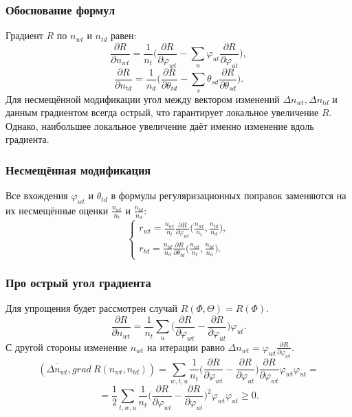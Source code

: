 \documentclass[utf8]{beamer}
\renewcommand{\geq}{\geqslant}
\renewcommand{\phi}{\varphi}
\begin{document}
	
\begin{frame}
\frametitle{Обоснование формул}
Градиент $R$ по $n_{wt}$ и $n_{td}$ равен:
\[
\frac{\partial{R}}{\partial{n_{wt}}} = \frac{1}{n_t} \bigg(\frac{\partial{R}}{\partial{\phi_{wt}}} - \sum\limits_u \phi_{ut} \frac{\partial{R}}{\partial{\phi_{ut}}}\bigg),
\]
\[
\frac{\partial{R}}{\partial{n_{td}}} = \frac{1}{n_d} \bigg( \frac{\partial{R}}{\partial{\theta_{td}}} - \sum\limits_s \theta_{sd} \frac{\partial{R}}{\partial{\theta_{sd}}} \bigg).
\]
Для несмещённой модификации угол между вектором изменений $\Delta n_{wt}, \Delta n_{td}$ и данным градиентом всегда острый, что гарантирует локальное увеличение $R$. Однако, наибольшее локальное увеличение даёт именно изменение вдоль градиента.
\end{frame}


\begin{frame}
\frametitle{Несмещённая модификация}
Все вхождения $\phi_{wt}$ и $\theta_{td}$ в формулы регуляризационных поправок заменяются на их несмещённые оценки $\frac{n_{wt}}{n_t}$ и $\frac{n_{td}}{n_d}$:
\[
\left\{
	\begin{aligned}
		r_{wt} =  \frac{n_{wt}}{n_t} \frac{\partial{R}}{\partial{\phi_{wt}}} \bigg(\frac{n_{wt}}{n_t}, \frac{n_{td}}{n_d}\bigg),\\
		r_{td} = \frac{n_{td}}{n_d} \frac{\partial{R}}{\partial{\theta_{td}}} \bigg(\frac{n_{wt}}{n_t}, \frac{n_{td}}{n_d}\bigg).
	\end{aligned}
\right.
\]
\end{frame}

\begin{frame}
\frametitle{Про острый угол градиента}

Для упрощения будет рассмотрен случай $R(\Phi, \Theta) = R(\Phi)$.
\[
\frac{\partial{R}}{\partial{n_{wt}}}  = \frac{1}{n_t} \sum_{u} \bigg(\frac{\partial{R}}{\partial{\phi_{wt}}}  -  \frac{\partial{R}}{\partial{\phi_{ut}}} \bigg)  \phi_{ut}.
\]
С другой стороны изменение $n_{wt}$ на итерации равно $ \Delta n_{wt} =  \phi_{wt} \frac{\partial{R}}{\partial{\phi_{wt}}}$.
\[
(\overline{\Delta n_{wt}}, grad\ R(n_{wt}, n_{td})) = \sum\limits_{w, t, u}  \frac{1}{n_{t}}  \bigg(  \frac{\partial{R}}{\partial{\phi_{wt}}}  -  \frac{\partial{R}}{\partial{\phi_{ut}}}  \bigg)  \frac{\partial{R}}{\partial{\phi_{wt}}} \phi_{wt} \phi_{ut}  = 
\]
\[
= \frac12  \sum\limits_{t, w, u}  \frac{1}{n_{t}} \bigg(  \frac{\partial{R}}{\partial{\phi_{wt}}}  -  \frac{\partial{R}}{\partial{\phi_{ut}}}  \bigg)^2 \phi_{wt} \phi_{ut}  \geq 0.
\]
\end{frame}
\end{document}
